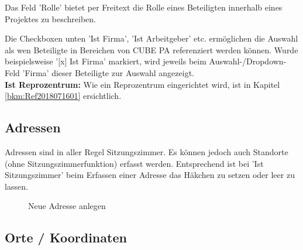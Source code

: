 Das Feld 'Rolle' bietet per Freitext die Rolle eines Beteiligten innerhalb eines Projektes zu beschreiben. 

\vspace{\baselineskip}

Die Checkboxen unten 'Ist Firma', 'Ist Arbeitgeber' etc. ermöglichen die Auswahl als wen Beteiligte in Bereichen von CUBE PA referenziert werden können. Wurde beispielsweise '[x] Ist Firma' markiert, wird jeweils beim Auswahl-/Dropdown-Feld 'Firma' dieser Beteiligte zur Auswahl angezeigt.\\

\textbf{Ist Reprozentrum:} Wie ein Reprozentrum eingerichtet wird, ist in Kapitel \ref{bkm:Ref2018071601} ersichtlich.

\vspace{\baselineskip}
\vspace{\baselineskip}
\vspace{\baselineskip}


\subsection{Adressen}

Adressen sind in aller Regel Sitzungszimmer. Es können jedoch auch Standorte (ohne Sitzungszimmerfunktion) erfasst werden. Entsprechend ist bei 'Ist Sitzungszimmer' beim Erfassen einer Adresse das Häkchen zu setzen oder leer zu lassen.

\begin{figure}[H]
\caption{Neue Adresse anlegen}
\end{figure}

\subsection{Orte / Koordinaten}

